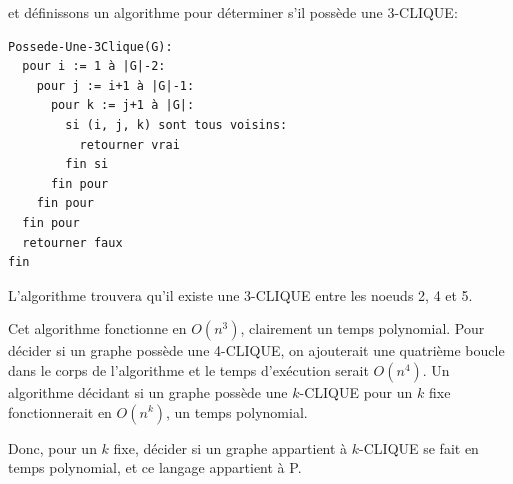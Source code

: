 \documentclass[10pt]{article}
\begin{document}
et définissons un algorithme pour déterminer s'il possède une
3-CLIQUE:

\begin{verbatim}
Possede-Une-3Clique(G):
  pour i := 1 à |G|-2:
    pour j := i+1 à |G|-1:
      pour k := j+1 à |G|:
        si (i, j, k) sont tous voisins:
          retourner vrai
        fin si
      fin pour
    fin pour
  fin pour
  retourner faux
fin
\end{verbatim}

L'algorithme trouvera qu'il existe une 3-CLIQUE entre les noeuds 2, 4
et 5.

Cet algorithme fonctionne en $O(n^3)$, clairement un temps polynomial.
Pour décider si un graphe possède une 4-CLIQUE, on ajouterait une
quatrième boucle dans le corps de l'algorithme et le temps d'exécution
serait $O(n^4)$.  Un algorithme décidant si un graphe possède une
$k$-CLIQUE pour un $k$ fixe fonctionnerait en $O(n^k)$, un temps
polynomial.

Donc, pour un $k$ fixe, décider si un graphe appartient à $k$-CLIQUE
se fait en temps polynomial, et ce langage appartient à P.
\end{document}
